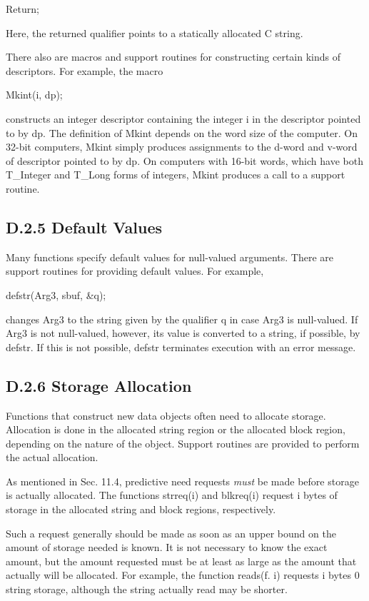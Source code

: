 {\ttfamily\mdseries
Return;}

Here, the returned qualifier points to a statically allocated C string.

There also are macros and support routines for constructing certain
kinds of descriptors. For example, the macro

{\ttfamily\mdseries
Mkint(i, dp);}

constructs an integer descriptor containing the integer i in the
descriptor pointed to by dp. The definition of Mkint depends on the
word size of the computer. On 32-bit computers, Mkint simply produces
assignments to the d-word and v-word of descriptor pointed to by
dp. On computers with 16-bit words, which have both T\_Integer and
T\_Long forms of integers, Mkint produces a call to a support routine.

\subsection{D.2.5 Default Values}

Many functions specify default values for null-valued arguments. There
are support routines for providing default values. For example,

{\ttfamily\mdseries
defstr(Arg3, sbuf, \&q);}

\noindent changes Arg3 to the string given by the qualifier q in case
Arg3 is null-valued. If Arg3 is not null-valued, however, its value is
converted to a string, if possible, by defstr. If this is not
possible, defstr terminates execution with an error message.

\subsection{D.2.6 Storage Allocation}

Functions that construct new data objects often need to allocate
storage. Allocation is done in the allocated string region or the
allocated block region, depending on the nature of the object. Support
routines are provided to perform the actual allocation.

As mentioned in Sec. 11.4, predictive need requests \textit{must} be
made before storage is actually allocated. The functions strreq(i) and
blkreq(i) request i bytes of storage in the allocated string and block
regions, respectively.

Such a request generally should be made as soon as an upper bound on
the amount of storage needed is known. It is not necessary to know the
exact amount, but the amount requested must be at least as large as
the amount that actually will be allocated. For example, the function
reads(f. i) requests i bytes 0 string storage, although the string
actually read may be shorter.

